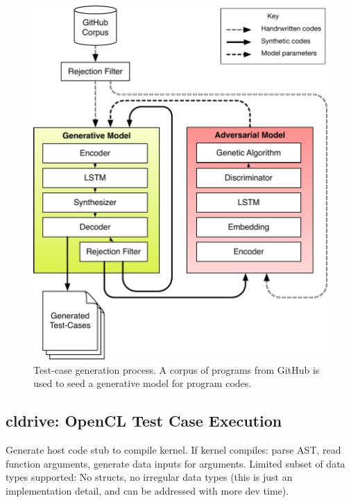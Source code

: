 \begin{figure}
  \centering
  \includegraphics[width=.95\columnwidth]{img/clgen} %
  \caption{%
    Test-case generation process. A corpus of programs from GitHub is used to seed a generative model for program codes.%
  }%
  \label{fig:deeptune}
\end{figure}

\subsection{cldrive: OpenCL Test Case Execution}

Generate host code stub to compile kernel. If kernel compiles: parse AST, read function arguments, generate data inputs for arguments. Limited subset of data types supported: No structs, no irregular data types (this is just an implementation detail, and can be addressed with more dev time).








\printbibliography

